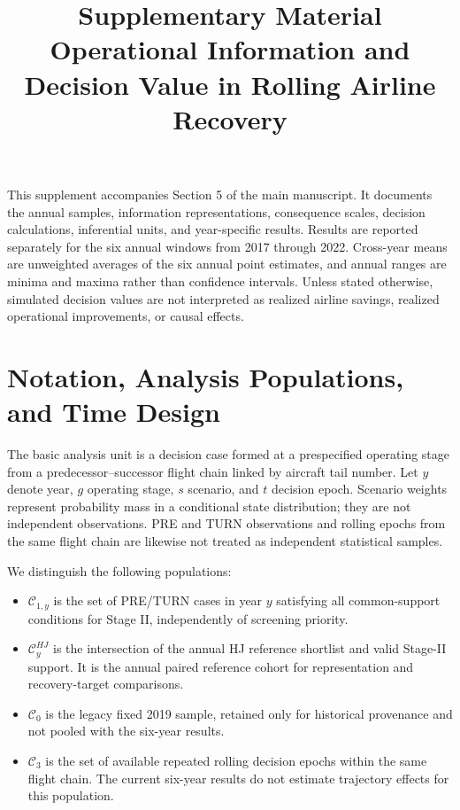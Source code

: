 \documentclass[10pt,a4paper]{article}
\author{}
\title{Supplementary Material\\[4pt]\large Operational Information and Decision Value in Rolling Airline Recovery}
\date{}
\numberwithin{equation}{section}
\begin{document}
\maketitle
\tableofcontents

This supplement accompanies Section 5 of the main manuscript. It documents the annual samples, information representations, consequence scales, decision calculations, inferential units, and year-specific results. Results are reported separately for the six annual windows from 2017 through 2022. Cross-year means are unweighted averages of the six annual point estimates, and annual ranges are minima and maxima rather than confidence intervals. Unless stated otherwise, simulated decision values are not interpreted as realized airline savings, realized operational improvements, or causal effects.

\section{Notation, Analysis Populations, and Time Design}
\label{sup:design}

The basic analysis unit is a decision case formed at a prespecified operating stage from a predecessor--successor flight chain linked by aircraft tail number. Let $y$ denote year, $g$ operating stage, $s$ scenario, and $t$ decision epoch. Scenario weights represent probability mass in a conditional state distribution; they are not independent observations. PRE and TURN observations and rolling epochs from the same flight chain are likewise not treated as independent statistical samples.

We distinguish the following populations:
\begin{itemize}
  \item $\mathcal C_{1,y}$ is the set of PRE/TURN cases in year $y$ satisfying all common-support conditions for Stage II, independently of screening priority.
  \item $\mathcal C^{HJ}_{y}$ is the intersection of the annual HJ reference shortlist and valid Stage-II support. It is the annual paired reference cohort for representation and recovery-target comparisons.
  \item $\mathcal C_0$ is the legacy fixed 2019 sample, retained only for historical provenance and not pooled with the six-year results.
  \item $\mathcal C_3$ is the set of available repeated rolling decision epochs within the same flight chain. The current six-year results do not estimate trajectory effects for this population.
\end{itemize}
\end{document}
